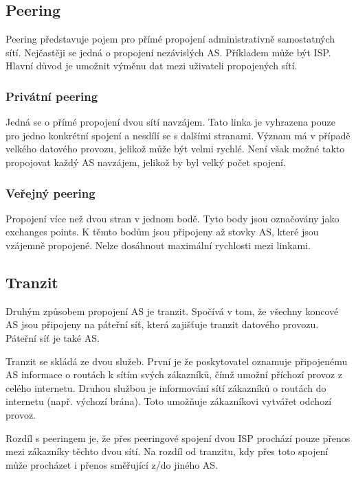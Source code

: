 \subsection{Peering}

Peering představuje pojem pro přímé propojení administrativně samostatných sítí.
Nejčastěji se jedná o propojení nezávislých AS.
Příkladem může být ISP.
Hlavní důvod je umožnit výměnu dat mezi uživateli propojených sítí.

\subsubsection{Privátní peering}

Jedná se o přímé propojení dvou sítí navzájem.
Tato linka je vyhrazena pouze pro jedno konkrétní spojení a nesdílí se s dalšími stranami.
Význam má v případě velkého datového provozu, jelikož může být velmi rychlé.
Není však možné takto propojovat každý AS navzájem, jelikož by byl velký počet spojení.

\subsubsection{Veřejný peering}

Propojení více než dvou stran v jednom bodě.
Tyto body jsou označovány jako exchanges points.
K těmto bodům jsou připojeny až stovky AS, které jsou vzájemně propojené.
Nelze dosáhnout maximální rychlosti mezi linkami.

\subsection{Tranzit}

Druhým způsobem propojení AS je tranzit.
Spočívá v tom, že všechny koncové AS jsou připojeny na páteřní síť, která zajišťuje tranzit datového provozu.
Páteřní síť je také AS.

Tranzit se skládá ze dvou služeb.
První je že poskytovatel oznamuje připojenému AS informace o routách k sítím svých zákazníků, čímž umožní příchozí provoz z celého internetu.
Druhou službou je informování sítí zákazníků o routách do internetu (např. výchozí brána).
Toto umožňuje zákazníkovi vytvářet odchozí provoz.

Rozdíl s peeringem je, že přes peeringové spojení dvou ISP prochází pouze přenos mezi zákazníky těchto dvou sítí.
Na rozdíl od tranzitu, kdy přes toto spojení může procházet i přenos směřující z/do jiného AS.


